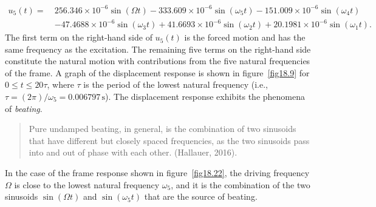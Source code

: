 \documentclass{AeroStructure-ERJohnson}
\begin{document}
\begin{example}
\begin{align}\label{ex18.5x}
u_{5}(t)=\ &256.346 \times 10^{-6} \sin (\Omega t)-333.609 \times 10^{-6} \sin \left(\omega_{5} t\right)-151.009 \times 10^{-6} \sin \left(\omega_{4} t\right)\nonumber\\
&-47.4688 \times 10^{-6} \sin \left(\omega_{3} t\right)+ 41.6693 \times 10^{-6} \sin \left(\omega_{2} t\right)+20.1981 \times 10^{-6} \sin \left(\omega_{1} t\right).
\end{align}
{\def\thefigure{18.22}
}
The first term on the right-hand side of $u_{5}(t)$ is the forced motion and has the same frequency as the excitation. The remaining five terms on the right-hand side constitute the natural motion with contributions from the five natural frequencies of the frame. A graph of the displacement response is shown in figure~\ref{fig18.9} for $0 \leq t \leq 20 \tau$, where $\tau$ is the period of the lowest natural frequency (i.e., $\tau=(2 \pi)/\omega_{5}=0.006797\,\mathrm{s}$). The displacement response exhibits the phenomena of \textit{beating}.
\begin{quote}
 Pure undamped beating, in general, is the combination of two sinusoids that have different but closely spaced frequencies, as the two sinusoids pass into and out of phase with each other. (Hallauer, 2016).
\end{quote}
In the case of the frame response shown in figure~\ref{fig18.22}, the driving frequency $\Omega$ is close to the lowest natural frequency $\omega_{5}$, and it is the combination of the two sinusoids $\sin (\Omega t)$ and $\sin \left(\omega_{5} t\right)$ that are the source of beating.


\end{example}
\end{document}
